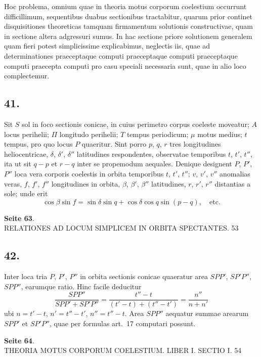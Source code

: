 \documentclass[12pt,a4paper]{article}
\begin{document}
Hoc problema, omnium quae in theoria motus corporum coelestium occurrunt difficillimum, sequentibus duabus sectionibus tractabitur, quarum prior continet disquisitiones theoreticas tamquam firmamentum solutionis constructivae, quam in sectione altera adgressuri sumus. In hac sectione priore solutionem generalem quam fieri potest simplicissime explicabimus, neglectis iis, quae ad determinationes praeceptaque computi praeceptaque computi praeceptaque computi praecepta computi pro casu speciali necessaria sunt, quae in alio loco complectemur.

\subsection*{41.}

Sit $S$ sol in foco sectionis conicae, in cuius perimetro corpus coeleste moveatur; $A$ locus perihelii; $\Pi$ longitudo perihelii; $T$ tempus periodicum; $\mu$ motus medius; $t$ tempus, pro quo locus $P$ quaeritur. Sint porro $p$, $q$, $r$ tres longitudines heliocentricae, $\delta$, $\delta'$, $\delta''$ latitudines respondentes, observatae temporibus $t$, $t'$, $t''$, ita ut sit $q - p$ et $r - q$ inter se propemodum aequales. Denique designent $P$, $P'$, $P''$ loca vera corporis coelestis in orbita temporibus $t$, $t'$, $t''$; $v$, $v'$, $v''$ anomalias veras, $f$, $f'$, $f''$ longitudines in orbita, $\beta$, $\beta'$, $\beta''$ latitudines, $r$, $r'$, $r''$ distantias a sole; unde erit
\[
\cos \beta \sin f = \sin \delta \sin q + \cos \delta \cos q \sin(p - q), \quad\text{etc.}
\]

\textbf{Seite 63}.\\
RELATIONES AD LOCUM SIMPLICEM IN ORBITA SPECTANTES. 53

\subsection*{42.}

Inter loca tria $P$, $P'$, $P''$ in orbita sectionis conicae quaeratur area $SPP'$, $SP'P''$, $SPP''$, earumque ratio. Hinc facile deducitur
\[
\frac{SPP''}{SPP' + SP'P''} = \frac{t'' - t}{(t' - t) + (t'' - t')} = \frac{n''}{n + n'}
\]
ubi $n = t' - t$, $n' = t'' - t'$, $n'' = t'' - t$. Area $SPP''$ aequatur summae arearum $SPP'$ et $SP'P''$, quae per formulas art.~17 computari possunt.

\textbf{Seite 64}.\\
THEORIA MOTUS CORPORUM COELESTIUM. LIBER I. SECTIO I. 54
\end{document}
